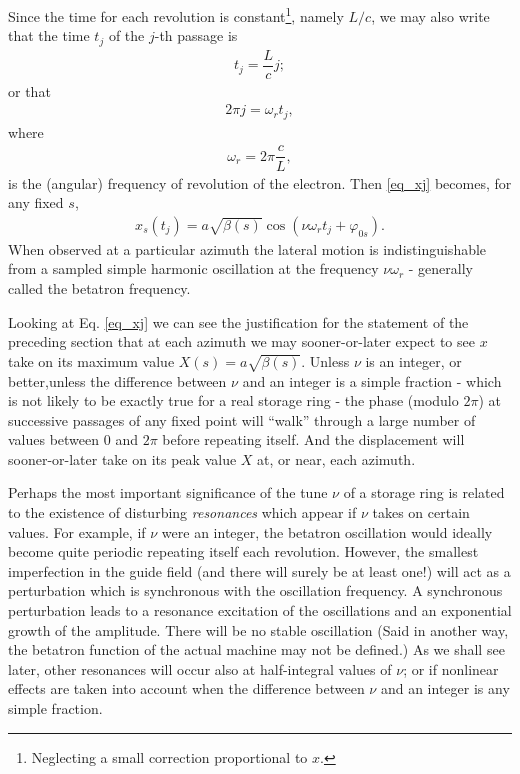 Since the time for each revolution is constant\footnote{Neglecting a small correction proportional to $x$.}, namely $L/c$, we may also write that the time $t_j$ of the $j$-th passage is
\begin{align*}
	t_j = \dfrac{L}{c}j;
\end{align*}
or that
\begin{align}
	2\pi j = \omega_r t_j,
\end{align}
where
\begin{align}
	\omega_r = 2\pi \dfrac{c}{L},
\end{align}
is the (angular) frequency of revolution of the electron. Then \eqref{eq_xj} becomes, for any fixed $s$,
\begin{align}
	x_s(t_j) = a \sqrt{\beta(s)}\cos(\nu \omega_r t_j + \varphi_{0s}).
\end{align}
When observed at a particular azimuth the lateral motion is indistinguishable from a sampled simple harmonic oscillation  at the frequency $\nu \omega_r$ - generally called the betatron frequency.

Looking at Eq. \eqref{eq_xj} we can see the justification for the statement of the preceding section that at each azimuth we may sooner-or-later expect to see $x$ take on its maximum value $X(s)=a\sqrt{\beta(s)}$. Unless $\nu$ is an integer, or better,unless the difference between $\nu$ and an integer is a simple fraction - which is not likely to be exactly true for a real storage ring - the phase (modulo $2\pi$) at successive passages of any fixed point will ``walk'' through a large number of values between $0$ and $2\pi$ before repeating itself. And the displacement will sooner-or-later take on its peak value $X$ at, or near, each azimuth.

Perhaps the most important significance of the tune $\nu$ of a storage ring is related to the existence of disturbing \textit{resonances} which appear if $\nu$ takes on certain values. For example, if $\nu$ were an integer, the betatron oscillation would ideally become quite periodic repeating itself each revolution. However, the smallest imperfection in the guide field (and there will surely be at least one!) will act as a perturbation which is synchronous with the oscillation frequency. A synchronous perturbation leads to a resonance excitation of the oscillations and an exponential growth of the amplitude.  There will be no stable oscillation (Said in another way, the betatron function of the actual machine may not be defined.) As we shall see later, other resonances will occur also at half-integral values of $\nu$; or if nonlinear effects are taken into account when the difference between $\nu$ and an integer is any simple fraction.

